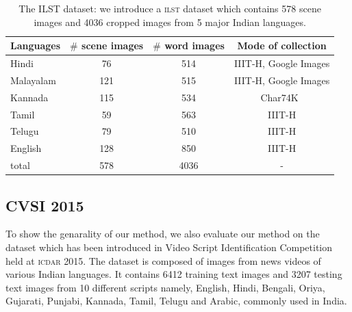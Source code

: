 \begin{table}
\caption{The ILST dataset: we introduce a \textsc{ilst} dataset which contains 578 scene images and 4036 cropped images from 5 major Indian languages.}
\centering
\begin{tabular}{|l|c|c|c|}
\hline

Languages & $\#$ scene images & $\#$ word images & Mode of collection\\
\hline\hline
Hindi & 76 & 514 & IIIT-H, Google Images \\%
\hline
Malayalam & 121 & 515 & IIIT-H, Google Images  \\
\hline
Kannada & 115 & 534 & Char74K~\cite{deCampos09}\\
\hline
Tamil & 59 &563 & IIIT-H \\%
\hline
Telugu & 79 &510 & IIIT-H \\%
\hline
English & 128  & 850 & IIIT-H \\%
\hline
total & 578 & 4036 & -\\
\hline

\end{tabular}
\label{tab:dataset}
\end{table}

\subsection{CVSI 2015~\cite{CVSIComp}}
To show the genarality of our method, we also evaluate our method on the dataset which has been introduced in Video Script Identification Competition held at \textsc{icdar 2015}.  
The dataset is composed of images from news videos of various Indian
languages. It contains 6412 training text images and 3207 testing text images from 10 different scripts
namely, English, Hindi, Bengali, Oriya, Gujarati, Punjabi, Kannada,
Tamil, Telugu and Arabic, commonly used in India.

